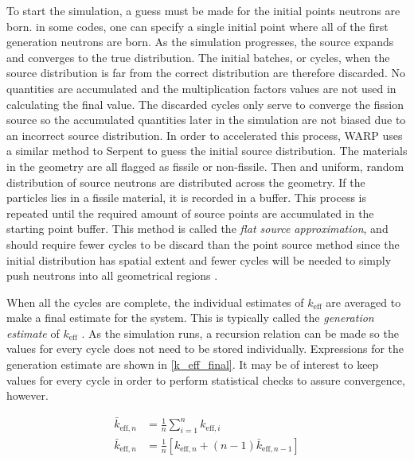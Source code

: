 To start the simulation, a guess must be made for the initial points neutrons are born.  in some codes, one can specify a single initial point where all of the first generation neutrons are born.  As the simulation progresses, the source expands and converges to the true distribution.  The initial batches, or cycles, when the source distribution is far from the correct distribution are therefore discarded.  No quantities are accumulated and the multiplication factors values are not used in calculating the final value.  The discarded cycles only serve to converge the fission source so the accumulated quantities later in the simulation are not biased due to an incorrect source distribution.  In order to accelerated this process, WARP uses a similar method to Serpent to guess the initial source distribution.  The materials in the geometry are all flagged as fissile or non-fissile.  Then and uniform, random distribution of source neutrons are distributed across the geometry.  If the particles lies in a fissile material, it is recorded in a buffer.  This process is repeated until the required amount of source points are accumulated in the starting point buffer.  This method is called the \emph{flat source approximation}, and should require fewer cycles to be discard than the point source method since the initial distribution has spatial extent and fewer cycles will be needed to simply push neutrons into all geometrical regions \cite{jaakko}.

When all the cycles are complete, the individual estimates of $k_\mathrm{eff}$ are averaged to make a final estimate for the system.  This is typically called the \emph{generation estimate} of $k_\mathrm{eff}$ \cite{jaakko}.  As the simulation runs, a recursion relation can be made so the values for every cycle does not need to be stored individually.  Expressions for the generation estimate are shown in \eqref{k_eff_final}.  It may be of interest to keep values for every cycle in order to perform statistical checks to assure convergence, however.

\begin{equation}
\label{k_eff_final}
\begin{split}
\bar{k}_{\mathrm{eff},n} &= \frac{1}{n} \sum_{i=1}^{n} k_{\mathrm{eff},i} \\
\bar{k}_{\mathrm{eff},n} &= \frac{1}{n} \left[ k_{\mathrm{eff},n} + (n-1) \bar{k}_{\mathrm{eff},n-1}  \right]
\end{split}
\end{equation}


